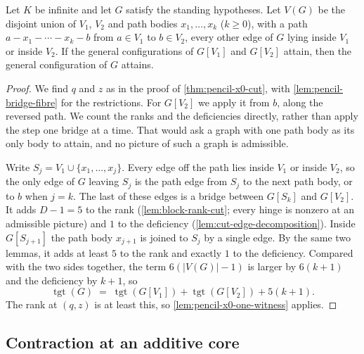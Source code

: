 \begin{theorem}
  \label{thm:pencil-x0-bridge}
  \leanok
  Let $K$ be infinite and let $G$ satisfy the standing hypotheses. Let
  $V(G)$ be the disjoint union of $V_1$, $V_2$ and path bodies
  $x_1, \dots, x_k$ ($k \ge 0$), with a path $a - x_1 - \cdots - x_k - b$
  from $a \in V_1$ to $b \in V_2$, every other edge of $G$ lying inside
  $V_1$ or inside $V_2$. If the general configurations of $G[V_1]$ and
  $G[V_2]$ attain, then the general configuration of $G$ attains.
\end{theorem}
\begin{proof}
  \leanok
  We find $q$ and $z$ as in the proof of \cref{thm:pencil-x0-cut}, with
  \cref{lem:pencil-bridge-fibre} for the restrictions. For $G[V_2]$ we
  apply it from $b$, along the reversed path. We count the ranks and the
  deficiencies directly, rather than apply the step one bridge at a
  time. That would ask a graph with one path body as its only body to
  attain, and no picture of such a graph is admissible.

  Write $S_j = V_1 \cup \{x_1, \dots, x_j\}$. Every edge off the path
  lies inside $V_1$ or inside $V_2$, so the only edge of $G$ leaving
  $S_j$ is the path edge from $S_j$ to the next path body, or to $b$
  when $j = k$. The last of these edges is a bridge between $G[S_k]$ and
  $G[V_2]$. It adds $D - 1 = 5$ to the rank (\cref{lem:block-rank-cut};
  every hinge is nonzero at an admissible picture) and $1$ to the
  deficiency (\cref{lem:cut-edge-decomposition}). Inside $G[S_{j+1}]$ the
  path body $x_{j+1}$ is joined to $S_j$ by a single edge. By the same
  two lemmas, it adds at least $5$ to the rank and exactly $1$ to the
  deficiency. Compared with the two sides together, the term
  $6(|V(G)| - 1)$ is larger by $6(k + 1)$ and the deficiency by $k + 1$,
  so
  \[
    \operatorname{tgt}(G) \;=\; \operatorname{tgt}(G[V_1]) +
    \operatorname{tgt}(G[V_2]) + 5(k + 1).
  \]
  The rank at $(q, z)$ is at least this, so
  \cref{lem:pencil-x0-one-witness} applies.
\end{proof}

\subsection{Contraction at an additive core}
\label{sec:main-component-contract}

